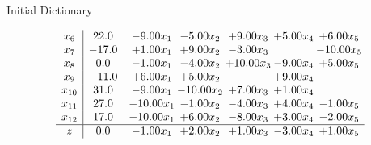 \documentclass[8pt]{article}
\begin{document}
Initial Dictionary 

\[\begin{array}{c| c c@{\hskip 2pt} c@{\hskip 2pt} c@{\hskip 2pt} c@{\hskip 2pt} c@{\hskip 2pt} }
 x_{6}   &  22.0 & -9.00 x_{1} & -5.00 x_{2} & +  9.00 x_{3} & +  5.00 x_{4} & +  6.00 x_{5}\\
 x_{7}   &  -17.0 & +  1.00 x_{1} & +  9.00 x_{2} & -3.00 x_{3} &   & -10.00 x_{5}\\
 x_{8}   &  0.0 & -1.00 x_{1} & -4.00 x_{2} & + 10.00 x_{3} & -9.00 x_{4} & +  5.00 x_{5}\\
 x_{9}   &  -11.0 & +  6.00 x_{1} & +  5.00 x_{2} &   & +  9.00 x_{4} &   \\
 x_{10}   &  31.0 & -9.00 x_{1} & -10.00 x_{2} & +  7.00 x_{3} & +  1.00 x_{4} &   \\
 x_{11}   &  27.0 & -10.00 x_{1} & -1.00 x_{2} & -4.00 x_{3} & +  4.00 x_{4} & -1.00 x_{5}\\
 x_{12}   &  17.0 & -10.00 x_{1} & +  6.00 x_{2} & -8.00 x_{3} & +  3.00 x_{4} & -2.00 x_{5}\\
\hline
z    &  0.0 & -1.00 x_{1} & +  2.00 x_{2} & +  1.00 x_{3} & -3.00 x_{4} & +  1.00 x_{5}\\
\end{array}\]
\end{document}
